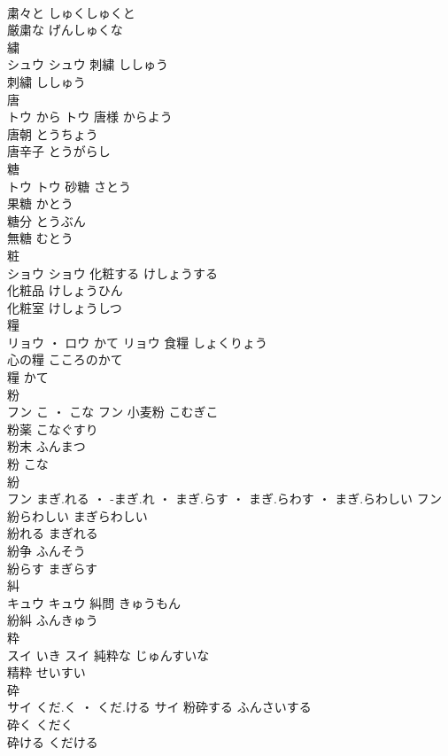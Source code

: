 \documentclass[8pt]{extreport}
\begin{document}
\begin{CJK}{UTF8}{min}
\\	粛々と	しゅくしゅくと	
\\	厳粛な	げんしゅくな	
\\	繍	
\\	シュウ		シュウ	刺繍	ししゅう	
\\	刺繍	ししゅう	
\\	唐	
\\	トウ	から	トウ	唐様	からよう	
\\	唐朝	とうちょう	
\\	唐辛子	とうがらし	
\\	糖	
\\	トウ		トウ	砂糖	さとう	
\\	果糖	かとう	
\\	糖分	とうぶん	
\\	無糖	むとう	
\\	粧	
\\	ショウ		ショウ	化粧する	けしょうする	
\\	化粧品	けしょうひん	
\\	化粧室	けしょうしつ	
\\	糧	
\\	リョウ ・ ロウ	かて	リョウ	食糧	しょくりょう	
\\	心の糧	こころのかて	
\\	糧	かて	
\\	粉	
\\	フン	こ ・ こな	フン	小麦粉	こむぎこ	
\\	粉薬	こなぐすり	
\\	粉末	ふんまつ	
\\	粉	こな	
\\	紛	
\\	フン	まぎ.れる ・ -まぎ.れ ・ まぎ.らす ・ まぎ.らわす ・ まぎ.らわしい	フン	紛らわしい	まぎらわしい	
\\	紛れる	まぎれる	
\\	紛争	ふんそう	
\\	紛らす	まぎらす	
\\	糾	
\\	キュウ		キュウ	糾問	きゅうもん	
\\	紛糾	ふんきゅう	
\\	粋	
\\	スイ	いき	スイ	純粋な	じゅんすいな	
\\	精粋	せいすい	
\\	砕	
\\	サイ	くだ.く ・ くだ.ける	サイ	粉砕する	ふんさいする	
\\	砕く	くだく	
\\	砕ける	くだける	

\end{CJK}
\end{document}
